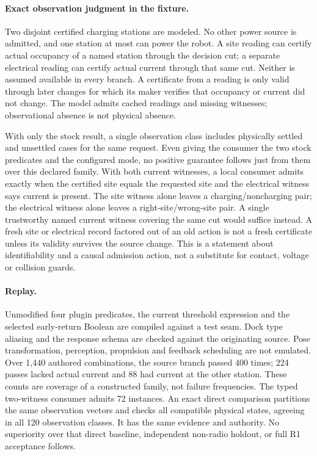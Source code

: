 \documentclass[11pt]{article}
\begin{document}
\paragraph{Exact observation judgment in the fixture.}
Two disjoint certified charging stations are modeled. No other power source is admitted, and one station at most can power the robot. A site reading can certify actual occupancy of a named station through the decision cut; a separate electrical reading can certify actual current through that same cut. Neither is assumed available in every branch. A certificate from a reading is only valid through later changes for which its maker verifies that occupancy or current did not change. The model admits cached readings and missing witnesses; observational absence is not physical absence.
\par
With only the stock result, a single observation class includes physically settled and unsettled cases for the same request. Even giving the consumer the two stock predicates and the configured mode, no positive guarantee follows just from them over this declared family. With both current witnesses, a local consumer admits exactly when the certified site equals the requested site and the electrical witness says current is present. The site witness alone leaves a charging/noncharging pair; the electrical witness alone leaves a right-site/wrong-site pair. A single trustworthy named current witness covering the same cut would suffice instead. A fresh site or electrical record factored out of an old action is not a fresh certificate unless its validity survives the source change. This is a statement about identifiability and a causal admission action, not a substitute for contact, voltage or collision guards.
\paragraph{Replay.}
Unmodified four plugin predicates, the current threshold expression and the selected early-return Boolean are compiled against a test seam. Dock type aliasing and the response schema are checked against the originating source. Pose transformation, perception, propulsion and feedback scheduling are not emulated. Over 1,440 authored combinations, the source branch passed 400 times; 224 passes lacked actual current and 88 had current at the other station. These counts are coverage of a constructed family, not failure frequencies. The typed two-witness consumer admits 72 instances. An exact direct comparison partitions the same observation vectors and checks all compatible physical states, agreeing in all 120 observation classes. It has the same evidence and authority. No superiority over that direct baseline, independent non-radio holdout, or full R1 acceptance follows.
\end{document}
